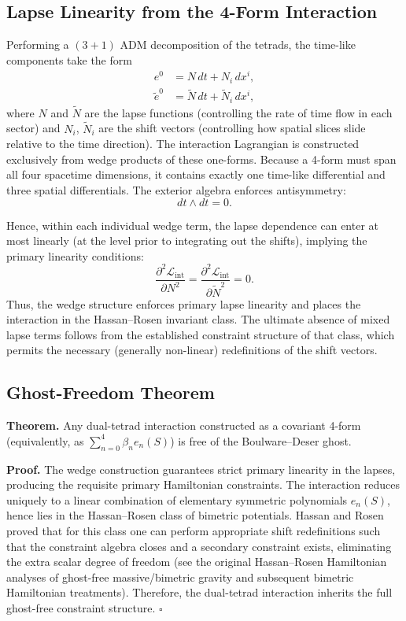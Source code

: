 \documentclass[twocolumn]{iopjournal}
\begin{document}
\subsection*{Lapse Linearity from the 4-Form Interaction}
Performing a $(3+1)$ ADM decomposition of the tetrads, the time-like components take the form
\begin{align}
e^0 &= N\, dt + N_i\, dx^i, \nonumber \\
\tilde{e}^0 &= \tilde{N}\, dt + \tilde{N}_i\, dx^i,
\end{align}
where $N$ and $\tilde{N}$ are the lapse functions (controlling the rate of time flow in each sector) and $N_i$, $\tilde{N}_i$ are the shift vectors (controlling how spatial slices slide relative to the time direction). The interaction Lagrangian is constructed exclusively from wedge products of these one-forms. Because a 4-form must span all four spacetime dimensions, it contains exactly one time-like differential and three spatial differentials. The exterior algebra enforces antisymmetry:
\begin{equation}
dt \wedge dt = 0.
\end{equation}


Hence, within each individual wedge term, the lapse dependence can enter at most linearly (at the level prior to integrating out the shifts), implying the primary linearity conditions:
\begin{equation}
\frac{\partial^2 \mathcal{L}_{\text{int}}}{\partial N^2}
= \frac{\partial^2 \mathcal{L}_{\text{int}}}{\partial \tilde{N}^2}
= 0.
\end{equation}
Thus, the wedge structure enforces primary lapse linearity and places the interaction in the Hassan--Rosen invariant class. The ultimate absence of mixed lapse terms follows from the established constraint structure of that class, which permits the necessary (generally non-linear) redefinitions of the shift vectors.

\subsection*{Ghost-Freedom Theorem}

\textbf{Theorem.}
Any dual-tetrad interaction constructed as a covariant 4-form (equivalently, as $\sum_{n=0}^4 \beta_n e_n(S)$) is free of the Boulware--Deser ghost.

\textbf{Proof.}
The wedge construction guarantees strict primary linearity in the lapses, producing the requisite primary Hamiltonian constraints. The interaction reduces uniquely to a linear combination of elementary symmetric polynomials $e_n(S)$, hence lies in the Hassan--Rosen class of bimetric potentials. Hassan and Rosen proved that for this class one can perform appropriate shift redefinitions such that the constraint algebra closes and a secondary constraint exists, eliminating the extra scalar degree of freedom (see the original Hassan--Rosen Hamiltonian analyses of ghost-free massive/bimetric gravity and subsequent bimetric Hamiltonian treatments). Therefore, the dual-tetrad interaction inherits the full ghost-free constraint structure. $\square$
\end{document}
